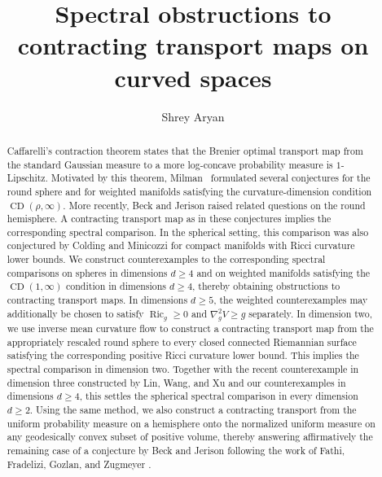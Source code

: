 \documentclass[11pt,reqno]{amsart}
\numberwithin{equation}{section}
\theoremstyle{definition}
\theoremstyle{remark}
\newcommand{\0}{\emptyset}
\newcommand{\CD}{\operatorname{CD}}
\begin{document}
\title[Spectral obstructions to contracting transport maps on curved spaces]{Spectral obstructions to contracting transport maps on curved spaces}
\author{Shrey Aryan}


\begin{abstract}
Caffarelli's contraction theorem states that the Brenier optimal transport
map from the standard Gaussian measure to a more log-concave probability
measure is $1$-Lipschitz. Motivated by this theorem,
Milman~\cite{milman2018spectral} formulated several conjectures for the
round sphere and for weighted manifolds satisfying the curvature-dimension
condition $\CD(\rho,\infty)$. More recently, Beck and Jerison
\cite{beck2021friedland} raised related questions on the round hemisphere.
A contracting transport map as in these conjectures implies the
corresponding spectral comparison. In the spherical setting, this
comparison was also conjectured by Colding and Minicozzi
\cite{colding1998weyl} for compact manifolds with Ricci curvature lower
bounds. We construct counterexamples to the corresponding spectral
comparisons on spheres in dimensions $d\geq4$ and on weighted manifolds
satisfying the $\CD(1,\infty)$ condition in dimensions $d\geq4$, thereby
obtaining obstructions to contracting transport maps. In dimensions
$d\geq5$, the weighted counterexamples may additionally be chosen to
satisfy $\operatorname{Ric}_g\geq 0$ and $\nabla_g^2V \geq g$ separately. In dimension two, we use inverse mean curvature flow to construct a contracting transport map from the appropriately rescaled round sphere to every closed connected Riemannian surface satisfying the corresponding positive Ricci curvature lower bound. This implies the spectral comparison in dimension two. Together with the recent counterexample in dimension three constructed by Lin, Wang, and Xu
\cite{lin2026eigenvalues} and our counterexamples in dimensions $d\geq4$, this settles the spherical spectral comparison in every dimension $d\geq2$. Using the same method, we also construct a contracting transport from the uniform probability measure on a hemisphere onto the
normalized uniform measure on any geodesically convex subset of positive volume, thereby answering affirmatively the remaining case of a conjecture by Beck and Jerison \cite{beck2021friedland} following the work of Fathi, Fradelizi, Gozlan, and Zugmeyer \cite{fathi2023some}.
\end{abstract}


\end{document}
